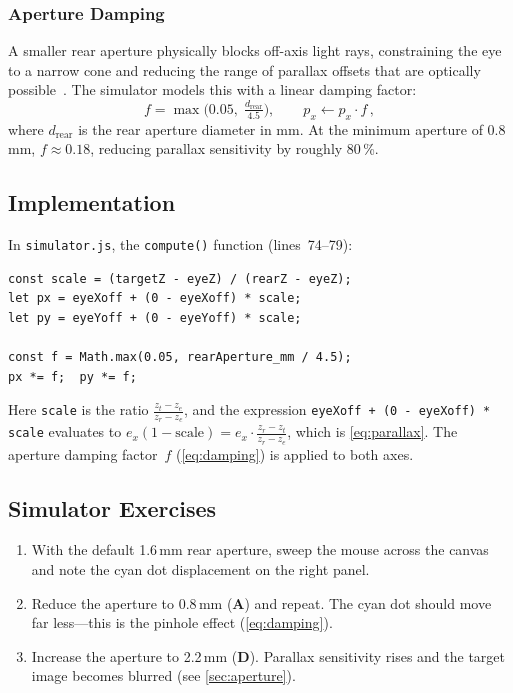 \documentclass[11pt]{article}
\newcommand{\code}[1]{\texttt{#1}}
\newcommand{\file}[1]{\texttt{#1}}
\newcommand{\key}[1]{\textsf{\textbf{#1}}}
\begin{document}
\subsubsection*{Aperture Damping}
A smaller rear aperture physically blocks off-axis light rays,
constraining the eye to a narrow cone and reducing the range of
parallax offsets that are optically possible~\cite{hecht,smith}.
The simulator models this with a linear damping factor:
\begin{equation}\label{eq:damping}
  f = \max\!\bigl(0.05,\;\tfrac{d_{\text{rear}}}{4.5}\bigr),
  \qquad p_x \leftarrow p_x \cdot f\,,
\end{equation}
where $d_{\text{rear}}$ is the rear aperture diameter in mm.  At the
minimum aperture of 0.8\,mm, $f \approx 0.18$, reducing parallax
sensitivity by roughly 80\,\%.

\subsection{Implementation}\label{sec:parallax-impl}
In \file{simulator.js}, the \code{compute()} function (lines~74--79):
\begin{lstlisting}
const scale = (targetZ - eyeZ) / (rearZ - eyeZ);
let px = eyeXoff + (0 - eyeXoff) * scale;
let py = eyeYoff + (0 - eyeYoff) * scale;

const f = Math.max(0.05, rearAperture_mm / 4.5);
px *= f;  py *= f;
\end{lstlisting}
Here \code{scale} is the ratio $\frac{z_t - z_e}{z_r - z_e}$, and
the expression \code{eyeXoff + (0 - eyeXoff) * scale} evaluates to
$e_x(1 - \text{scale}) = e_x \cdot \frac{z_r - z_t}{z_r - z_e}$,
which is \cref{eq:parallax}.  The aperture damping factor~$f$
(\cref{eq:damping}) is applied to both axes.

\subsection{Simulator Exercises}
\begin{enumerate}[nosep]
  \item With the default 1.6\,mm rear aperture, sweep the mouse across
        the canvas and note the cyan dot displacement on the right
        panel.
  \item Reduce the aperture to 0.8\,mm (\key{A}) and repeat.  The
        cyan dot should move far less---this is the pinhole effect
        (\cref{eq:damping}).
  \item Increase the aperture to 2.2\,mm (\key{D}).  Parallax
        sensitivity rises and the target image becomes blurred
        (see \cref{sec:aperture}).
\end{enumerate}
\end{document}
